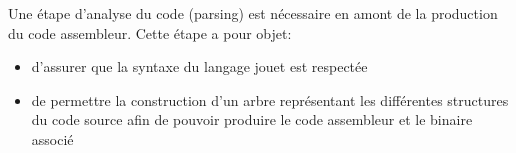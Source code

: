 Une étape d'analyse du code (parsing) est nécessaire en amont de la production du code assembleur. Cette étape a pour objet:
\begin{itemize}
	\item d'assurer que la syntaxe du langage jouet est respectée
	\item de permettre la construction d'un arbre représentant les différentes structures du code source afin de pouvoir produire le code assembleur et le binaire associé
\end{itemize}

